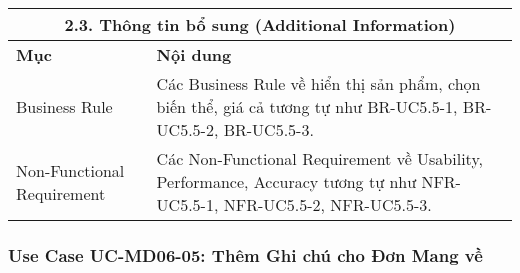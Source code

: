 \begin{longtable}{|m{4cm}|p{11cm}|}
\hline
\multicolumn{2}{|c|}{\textbf{2.3. Thông tin bổ sung (Additional Information)}} \\
\hline
\textbf{Mục} & \textbf{Nội dung} \\
\hline
Business Rule & Các Business Rule về hiển thị sản phẩm, chọn biến thể, giá cả tương tự như BR-UC5.5-1, BR-UC5.5-2, BR-UC5.5-3. \\
\hline
Non-Functional Requirement & Các Non-Functional Requirement về Usability, Performance, Accuracy tương tự như NFR-UC5.5-1, NFR-UC5.5-2, NFR-UC5.5-3. \\
\hline
\end{longtable}

\subsubsection{Use Case UC-MD06-05: Thêm Ghi chú cho Đơn Mang về}
